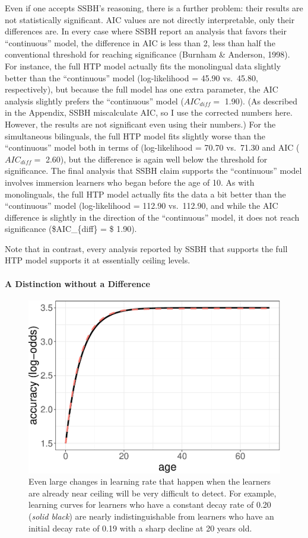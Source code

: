 \documentclass[
  english,
  doc,floatsintext]{apa6}
\let\oldparagraph\paragraph
\renewcommand{\paragraph}[1]{\oldparagraph{#1}\mbox{}}
\begin{document}
Even if one accepts SSBH's reasoning, there is a further problem: their results are not statistically significant. AIC values are not directly interpretable, only their differences are. In every case where SSBH report an analysis that favors their ``continuous'' model, the difference in AIC is less than 2, less than half the conventional threshold for reaching significance (Burnham \& Anderson, 1998). For instance, the full HTP model actually fits the monolingual data slightly better than the ``continuous'' model (log-likelihood = 45.90 vs.~45.80, respectively), but because the full model has one extra parameter, the AIC analysis slightly prefers the ``continuous'' model (\(AIC_{diff} =\) 1.90). (As described in the Appendix, SSBH miscalculate AIC, so I use the corrected numbers here. However, the results are not significant even using their numbers.) For the simultaneous bilinguals, the full HTP model fits slightly worse than the ``continuous'' model both in terms of (log-likelihood = 70.70 vs.~71.30 and AIC (\(AIC_{diff} =\) 2.60), but the difference is again well below the threshold for significance. The final analysis that SSBH claim supports the ``continuous'' model involves immersion learners who began before the age of 10. As with monolinguals, the full HTP model actually fits the data a bit better than the ``continuous'' model (log-likelihood = 112.90 vs.~112.90, and while the AIC difference is slightly in the direction of the ``continuous'' model, it does not reach significance (\$AIC\_\{diff\} = \$ 1.90).

Note that in contrast, every analysis reported by SSBH that supports the full HTP model supports it at essentially ceiling levels.

\hypertarget{a-distinction-without-a-difference}{%
\paragraph{A Distinction without a Difference}\label{a-distinction-without-a-difference}}



\begin{figure}
\includegraphics[width=0.35\linewidth]{SlikResponse_rmd_files/figure-latex/latechanges-1} \caption{Even large changes in learning rate that happen when the learners are already near ceiling will be very difficult to detect. For example, learning curves for learners who have a constant decay rate of 0.20 (\emph{solid black}) are nearly indistinguishable from learners who have an initial decay rate of 0.19 with a sharp decline at 20 years old.}\label{fig:latechanges}
\end{figure}
\end{document}
